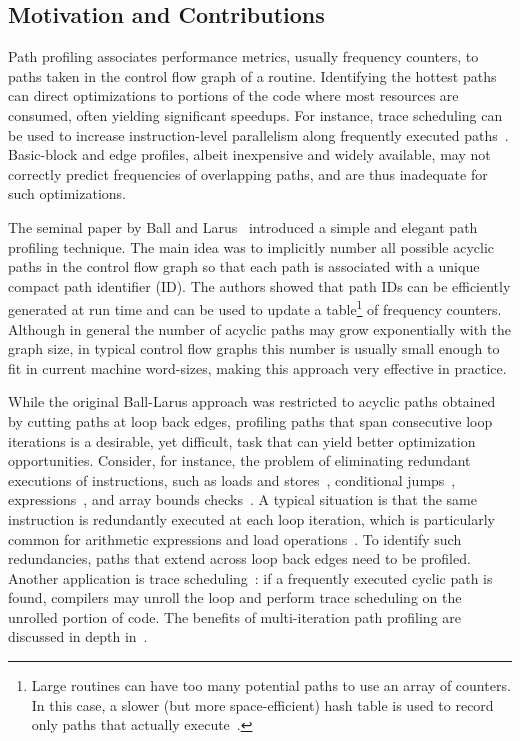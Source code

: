 \subsection{Motivation and Contributions}

Path profiling associates performance metrics, usually frequency counters, to paths taken in the control flow graph of a routine. Identifying the hottest paths can direct optimizations to portions of the code where most resources are consumed, often yielding significant speedups. For instance, trace scheduling can be used to increase instruction-level parallelism along frequently executed paths~\cite{Fisher81,Young98}. Basic-block and edge profiles, albeit inexpensive and widely available, may not correctly predict frequencies of overlapping paths, and are thus inadequate for such optimizations. 

The seminal paper by Ball and Larus~\cite{Ball96} introduced a simple and elegant path profiling technique. The main idea was to implicitly number all possible acyclic paths in the control flow graph so that each path is associated with a unique compact path identifier (ID). The authors showed that path IDs can be efficiently generated at run time and can be used to update a table\footnote{Large routines can have too many potential paths to use an array of counters. In this case, a slower (but more space-efficient) hash table is used to record only paths that actually execute~\cite{Ball96}.} of frequency counters. Although in general the number of acyclic paths may grow exponentially with the graph size, in typical control flow graphs this number is usually small enough to fit in current machine word-sizes, making this approach very effective in practice.

While the original Ball-Larus approach was restricted to acyclic paths obtained by cutting paths at loop back edges, profiling paths that span consecutive loop iterations is a desirable, yet difficult, task that can yield better optimization opportunities. Consider, for instance, the problem of eliminating redundant executions of instructions, such as loads and stores~\cite{Bodik99}, conditional jumps~\cite{Bodik97}, expressions~\cite{Bodik98,Bodik04}, and array bounds checks~\cite{Bodik00}. A typical situation is that the same instruction is redundantly executed at each loop iteration, which is particularly common for arithmetic expressions and load operations~\cite{Bodik04,Bodik99}. To identify such redundancies, paths that extend across loop back edges need to be profiled. Another application is trace scheduling~\cite{Young98}: if a frequently executed cyclic path is found, compilers may unroll the loop and perform trace scheduling on the unrolled portion of code. The benefits of multi-iteration path profiling are discussed in depth in~\cite{Tallam04}.

